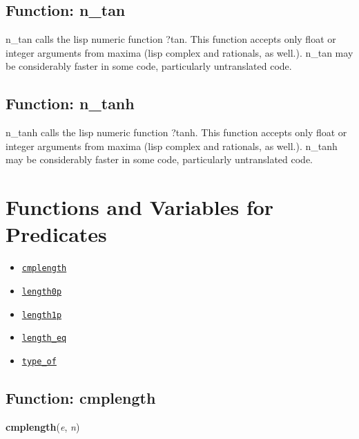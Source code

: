 \documentclass[]{article}
\begin{document}
\vspace{5 pt}


\subsection{Function: n\_tan\label{sec:n_tan}}
\hypertarget{n_tan}{}



\vspace{5 pt}
n\_tan calls the lisp numeric function ?tan. This function accepts only float or integer arguments from maxima (lisp complex and rationals, as well.). n\_tan may be considerably faster in some code, particularly untranslated code. 

\vspace{5 pt}


\subsection{Function: n\_tanh\label{sec:n_tanh}}
\hypertarget{n_tanh}{}



\vspace{5 pt}
n\_tanh calls the lisp numeric function ?tanh. This function accepts only float or integer arguments from maxima (lisp complex and rationals, as well.). n\_tanh may be considerably faster in some code, particularly untranslated code. 

\vspace{5 pt}


\section{Functions and Variables for Predicates}
\begin{itemize}
\item \hyperlink{cmplength}{{\tt cmplength}}
\item \hyperlink{length0p}{{\tt length0p}}
\item \hyperlink{length1p}{{\tt length1p}}
\item \hyperlink{length_eq}{{\tt length\_eq}}
\item \hyperlink{type_of}{{\tt type\_of}}
\end{itemize}
\subsection{Function: cmplength\label{sec:cmplength}}
\hypertarget{cmplength}{}
{\bf cmplength}({\it e}, {\it n})
\end{document}
